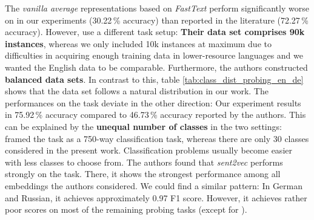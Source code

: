 The \textit{vanilla average} representations based on \textit{FastText} perform significantly worse on  in our experiments (30.22\,\% accuracy) than reported in the literature (72.27\,\% accuracy). However, \citep{Krasnowska.2019} use a different task setup: \textbf{Their data set comprises 90k instances}, whereas we only included 10k instances at maximum due to difficulties in acquiring enough training data in lower-resource languages and we wanted the English data to be comparable. Furthermore, the authors constructed \textbf{balanced data sets}. In contrast to this, table \vref{tab:class_dist_probing_en_de} shows that the  data set follows a natural distribution in our work. The performances on the  task deviate in the other direction: Our experiment results in 75.92\,\% accuracy compared to 46.73\,\% accuracy reported by the authors. This can be explained by the \textbf{unequal number of classes} in the two settings: \citep{Krasnowska.2019} framed the task as a 750-way classification task, whereas there are only 30 classes considered in the present work. Classification problems usually become easier with less classes to choose from. The authors found that \textit{sent2vec} performs strongly on the  task. There, it shows the strongest performance among all embeddings the authors considered. We could find a similar pattern: In German and Russian, it achieves approximately 0.97 F1 score. However, it achieves rather poor scores on most of the remaining probing tasks (except for ).

